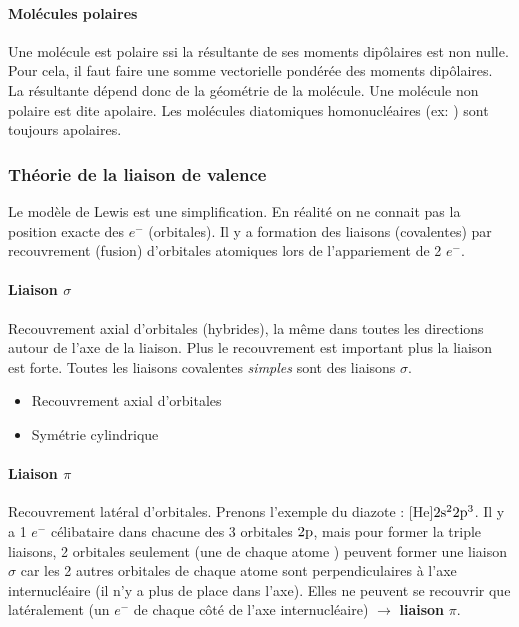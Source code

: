\paragraph{Molécules polaires}
Une molécule est polaire ssi la résultante de ses moments dipôlaires est non nulle.
Pour cela, il faut faire une somme vectorielle pondérée des moments dipôlaires.
La résultante dépend donc de la géométrie de la molécule.
Une molécule non polaire est dite apolaire.
Les molécules diatomiques homonucléaires (ex: ) sont toujours apolaires.

\subsubsection{Théorie de la liaison de valence}
Le modèle de Lewis est une simplification.
En réalité on ne connait pas la position exacte des $e^-$ (orbitales).
Il y a formation des liaisons (covalentes) par recouvrement (fusion) d'orbitales atomiques lors de l'appariement de 2 $e^-$.

\paragraph{Liaison $\sigma$}

Recouvrement axial d'orbitales (hybrides), la même dans toutes les directions autour de l'axe de la liaison.
Plus le recouvrement est important plus la liaison est forte.
Toutes les liaisons covalentes {\it simples} sont des liaisons $\sigma$.

\begin{itemize}
	\item Recouvrement axial d'orbitales
	\item Symétrie cylindrique
\end{itemize}

\paragraph{Liaison $\pi$}

Recouvrement latéral d'orbitales.
Prenons l'exemple du diazote : [He]$2\mathrm{s}^2 2\mathrm{p}^3$.
Il y a 1 $e^-$ célibataire dans chacune des 3 orbitales $2\mathrm{p}$,
mais pour former la triple liaisons,
2 orbitales seulement (une de chaque atome ) peuvent former une liaison $\sigma$ car les 2 autres orbitales de chaque atome sont perpendiculaires à l'axe internucléaire (il n'y a plus de place dans l'axe).
Elles ne peuvent se recouvrir que latéralement (un $e^-$ de chaque côté de l'axe internucléaire) $\rightarrow$ \textbf{liaison} $\pi$.

